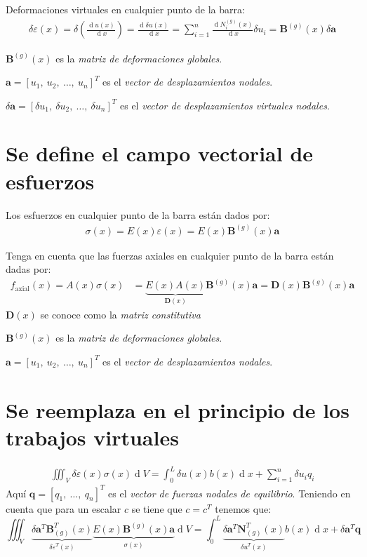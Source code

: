 \documentclass[12pt,letterpaper,landscape]{article}
\newcommand{\ve}[1]{{\boldsymbol{#1}}}
\newcommand{\ma}[1]{{\boldsymbol{#1}}}
\newcommand{\dd}{\operatorname{d} \!}
\begin{document}
Deformaciones virtuales  en cualquier punto de la barra:
\begin{align}
\delta \varepsilon(x) = \delta \left(\frac{\dd u(x)}{\dd x}\right) = \frac{\dd \delta u(x)}{\dd x} = \sum_{i=1}^n \frac{\dd N_i^{(g)}(x)}{\dd x} \delta u_i =
\ma{B}^{(g)}(x) \delta \ve{a}
\end{align}

$\ma{B}^{(g)}(x)$ es la \emph{matriz de deformaciones globales}.

$\ve{a} = [u_1,\ u_2,\ \ldots, \ u_n]^T$ es el \emph{vector de desplazamientos nodales}.

$\delta\ve{a} = [\delta u_1,\ \delta u_2,\ \ldots, \ \delta u_n]^T$ es el \emph{vector de desplazamientos virtuales nodales}.

\newpage

\section{Se define el campo vectorial de esfuerzos}
Los esfuerzos en cualquier punto de la barra están dados por:
\begin{align}
\sigma(x) = E(x) \varepsilon(x) = E(x) \ma{B}^{(g)}(x) \ve{a}
\end{align}

Tenga en cuenta que las fuerzas axiales en cualquier punto de la barra están dadas por:
\begin{align}
f_{\text{axial}}(x) = A(x) \sigma(x) &= \underbrace{E(x) A(x)}_{\ma{D}(x)} \ma{B}^{(g)}(x)
\ve{a} = \ma{D}(x) \ma{B}^{(g)}(x) \ve{a}
\end{align}
$\ma{D}(x)$ se conoce como la \emph{matriz constitutiva}

$\ma{B}^{(g)}(x)$ es la \emph{matriz de deformaciones globales}.

$\ve{a} = [u_1,\ u_2,\ \ldots, \ u_n]^T$ es el \emph{vector de desplazamientos nodales}.

\newpage
\section{Se reemplaza en el principio de los trabajos virtuales}
\begin{align}
\iiint_{V} \delta\varepsilon(x) \sigma(x) \dd V = \int_{0}^{L} \delta u(x) b(x) \dd x + \sum_{i=1}^n \delta u_i q_i
\end{align}
Aquí $\ve{q} = [q_1,\ \ldots,\ q_n]^T$ es el \emph{vector de fuerzas nodales de equilibrio}. Teniendo en cuenta que para un escalar $c$ se tiene que $c = c^T$ tenemos que:
\begin{equation}
\iiint_{V} \underbrace{\delta \ve{a}^T \ma{B}_{(g)}^T(x)}_{\delta\varepsilon^T(x)} \underbrace{E(x) \ma{B}^{(g)}(x) \ve{a}}_{\sigma(x)} \dd V = \int_{0}^{L} \underbrace{\delta \ve{a}^T \ma{N}_{(g)}^T(x)}_{\delta u^T(x)} b(x) \dd x +
\delta \ma{a}^T \ma{q}
\end{equation}
\end{document}
